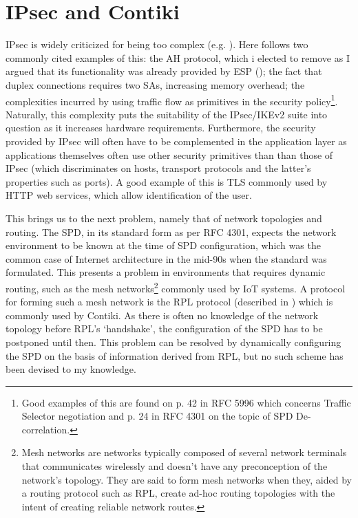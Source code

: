 \documentclass[final,a4paper,twoside,11pt,onecolumn]{report}
\begin{document}
\section{IPsec and Contiki}
IPsec is widely criticized for being too complex (e.g. \cite{Ferguson00acryptographic}). Here follows two commonly cited examples of this: the AH protocol, which i elected to remove as I argued that its functionality was already provided by ESP (); the fact that duplex connections requires two SAs, increasing memory overhead; the complexities incurred by using traffic flow as primitives in the security policy\footnote{Good examples of this are found on p. 42 in RFC 5996 which concerns Traffic Selector negotiation and p. 24 in RFC 4301 on the topic of SPD De-correlation.}. Naturally, this complexity puts the suitability of the IPsec/IKEv2 suite into question as it increases hardware requirements. Furthermore, the security provided by IPsec will often have to be complemented in the application layer as applications themselves often use other security primitives than than those of IPsec (which discriminates on hosts, transport protocols and the latter's properties such as ports). A good example of this is TLS commonly used by HTTP web services, which allow identification of the user.

This brings us to the next problem, namely that of network topologies and routing. The SPD, in its standard form as per RFC 4301, expects the network environment to be known at the time of SPD configuration, which was the common case of Internet architecture in the mid-90s when the standard was formulated. This presents a problem in environments that requires dynamic routing, such as the mesh networks\footnote{Mesh networks are networks typically composed of several network terminals that communicates wirelessly and doesn't have any preconception of the network's topology. They are said to form mesh networks when they, aided by a routing protocol such as RPL, create ad-hoc routing topologies with the intent of creating reliable network routes.} commonly used by IoT systems. A protocol for forming such a mesh network is the RPL protocol (described in \cite{rfc6550}) which is commonly used by Contiki. As there is often no knowledge of the network topology before RPL's `handshake', the configuration of the SPD has to be postponed until then. This problem can be resolved by dynamically configuring the SPD on the basis of information derived from RPL, but no such scheme has been devised to my knowledge.
\end{document}
